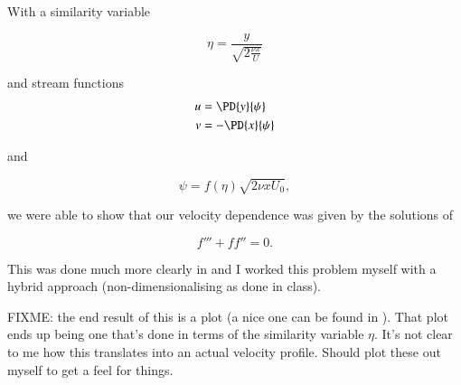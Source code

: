 With a similarity variable 

\begin{equation}\label{eqn:continuumFluidsReview:2530}
\eta = \frac{y}{\sqrt{2 \frac{\nu x}{U}}}
\end{equation}

and stream functions
\begin{align}\label{eqn:continuumFluidsReview:2550}
u &= \PD{y}{\psi} \\
v &= -\PD{x}{\psi}
\end{align}

and

\begin{equation}\label{eqn:continuumFluidsReview:2570}
\psi = f(\eta) \sqrt{ 2 \nu x U_0 },
\end{equation}

we were able to show that our velocity dependence was given by the solutions of

\begin{equation}\label{eqn:continuumFluidsReview:2590}
f''' + f f'' = 0.
\end{equation}

This was done much more clearly in \citep{acheson1990elementary} and I worked this problem myself with a hybrid approach (non-dimensionalising as done in class).

FIXME: the end result of this is a plot (a nice one can be found in \citep{wiki:BlasiusBoundary}).  That plot ends up being one that's done in terms of the similarity variable $\eta$.  It's not clear to me how this translates into an actual velocity profile.  Should plot these out myself to get a feel for things.

